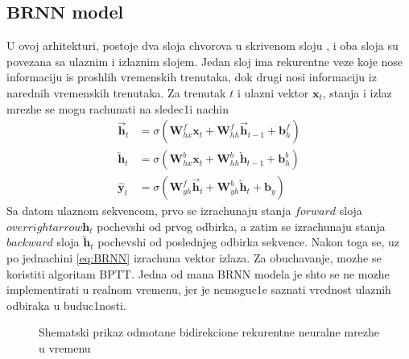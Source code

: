 \documentclass[a4paper, openany, oneside, 11pt]{book}
\begin{document}
\subsection[$BRNN$ model]{$\mathbf{BRNN}$ model}
U ovoj arhitekturi, postoje dva sloja chvorova u skrivenom sloju , i oba sloja su povezana sa ulaznim i izlaznim slojem. Jedan sloj ima rekurentne veze koje nose informaciju is proshlih vremenskih trenutaka, dok drugi nosi informaciju iz narednih vremenskih trenutaka. Za trenutak $t$ i ulazni vektor $\mathbf{x}_{t}$, stanja i izlaz mrezhe se mogu rachunati na sledec1i nachin
\begin{align}
\overrightarrow{\mathbf{h}}_t &= \sigma\left(\mathbf{W}^f_{hx}\mathbf{x}_t+\mathbf{W}^f_{hh}\overrightarrow{\mathbf{h}}_{t-1}+\mathbf{b}_h^f\right)\\
\overleftarrow{\mathbf{h}}_t &= \sigma\left(\mathbf{W}^b_{hx}\mathbf{x}_t+\mathbf{W}^b_{hh}\overleftarrow{\mathbf{h}}_{t-1}+\mathbf{b}_h^b\right)\\
\mathbf{\hat{y}}_t&= \sigma\left(\mathbf{W}^f_{yh}\overrightarrow{\mathbf{h}}_t +\mathbf{W}^b_{yh}\overleftarrow{\mathbf{h}}_t+\mathbf{b}_y\right) \label{eq:BRNN}
\end{align}
Sa datom ulaznom sekvencom, prvo se izrachunaju stanja $forward$ sloja $overrightarrow{\mathbf{h}}_t$ pochevshi od prvog odbirka, a zatim se izrachunaju stanja $backward$ sloja $\overleftarrow{\mathbf{h}}_t$ pochevshi od poslednjeg odbirka sekvence. Nakon toga se, uz po jednachini \ref{eq:BRNN} izrachuna vektor izlaza. Za obuchavanje, mozhe se koristiti algoritam \acrshort{BPTT}. Jedna od mana \acrshort{BRNN} modela je shto se ne mozhe implementirati u realnom vremenu, jer je nemoguc1e saznati vrednost ulaznih odbiraka u buduc1nosti.
\newpage
\begin{figure}[!h]
\hspace*{0.2\linewidth}
\caption{Shemat\-ski prikaz odmotane bidirekcione rekurentne neuralne mre\-zhe u vremenu}
\label{fig:12}
\end{figure}
\end{document}
